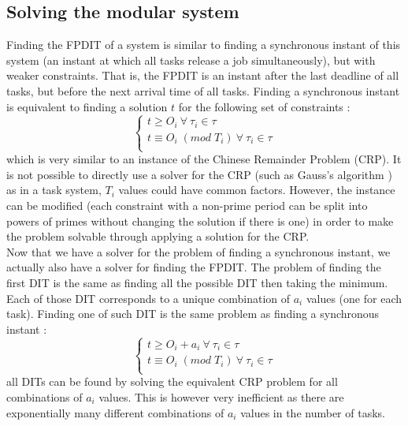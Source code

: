 \documentclass[conference]{IEEEtran}
\begin{document}
  \subsection{Solving the modular system}
    Finding the FPDIT of a system is similar to finding a synchronous instant of
    this system (an instant at which all tasks release a job simultaneously), but
    with weaker constraints. That is, the FPDIT is an instant after the last
    deadline of all tasks, but before the next arrival time of all tasks. Finding
    a synchronous instant is equivalent to finding a solution $t$ for the
    following set of constraints :
    \[
      \left\{
      \begin{array}{l}
        t \geqslant O_i \: \forall \: \tau_i \in \tau \\
        t \equiv O_i \; (mod \; T_i) \: \forall \: \tau_i \in \tau \\
      \end{array}
      \right.
    \]
    which is very similar to an instance of the Chinese Remainder Problem (CRP). It
    is not possible to directly use a solver for the CRP (such as Gauss's
    algorithm \cite{gauss1965disquisitiones}) as in a task system, $T_i$ values could have common factors.
    However, the instance can be modified (each constraint with a non-prime period can be split into powers of primes
    without changing the solution if there is one) in order to make the problem
    solvable through applying a solution for the CRP. \\

    Now that we have a solver for the problem of finding a synchronous instant, we
    actually also have a solver for finding the FPDIT. The problem of finding the
    first DIT is the same as finding all the possible DIT then taking the minimum.
    Each of those DIT corresponds to a unique combination of $a_i$ values (one
    for each task). Finding one of such DIT is the same problem as finding a
    synchronous instant :
    \[
      \left\{
      \begin{array}{l}
        t \geqslant O_i + a_i \: \forall \: \tau_i \in \tau \\
        t \equiv O_i \; (mod \; T_i) \: \forall \: \tau_i \in \tau \\
      \end{array}
      \right.
    \]
    all DITs can be found by solving the equivalent CRP problem for all
    combinations of $a_i$ values. This is however very inefficient as there are
    exponentially many different combinations of $a_i$ values in the number of
    tasks.\\
\end{document}
